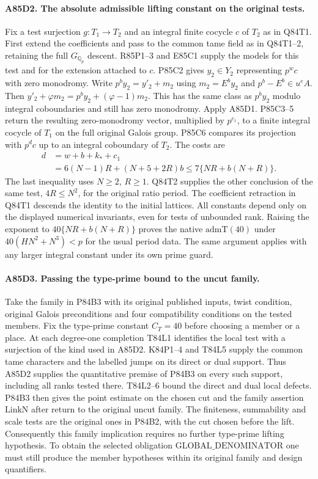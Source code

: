 \paragraph{A85D2. The absolute admissible lifting constant on the original tests.}
Fix a test surjection $g:T_1\to T_2$ and an integral finite
cocycle $c$ of $T_2$ as in Q84T1. First extend the coefficients
and pass to the common tame field as in Q84T1--2, retaining the
full $G_{\mathbb Q_p}$ descent. R85P1--3 and E85C1 supply the
models for this test and for the extension attached to $c$.
P85C2 gives $y_2\in Y_2$ representing $p^w c$ with zero
monodromy. Write $p^b y_2=y'_2+m_2$ using
$m_2=E^b y_2$ and $p^b-E^b\in u^e A$. Then
$y'_2+\varphi m_2=p^b y_2+(\varphi-1)m_2$. This has the
same class as $p^b y_2$ modulo integral coboundaries and still
has zero monodromy. Apply A85D1. P85C3--5 return the resulting
zero-monodromy vector, multiplied by $p^{c_1}$, to a finite
integral cocycle of $T_1$ on the full original Galois group.
P85C6 compares its projection with $p^{d}c$ up to an integral
coboundary of $T_2$. The costs are
\[
 \begin{aligned}
 d&=w+b+k_*+c_1\\
  &=6(N-1)R+(N+5+2R)b\le 7\{NR+b(N+R)\}.
 \end{aligned}
\]
The last inequality uses $N\ge2$, $R\ge1$. Q84T2 supplies the
other conclusion of the same test, $4R\le N^2$, for the original
ratio period. The coefficient
retraction in Q84T1 descends the identity to the initial lattices.
All constants depend only on the displayed numerical invariants,
even for tests of unbounded rank. Raising the exponent to
$40\{NR+b(N+R)\}$ proves the native $\mathrm{admT}(40)$
under $40(HN^2+N^3)<p$ for the usual period data. The same
argument applies with any larger integral constant under its own
prime guard.

\paragraph{A85D3. Passing the type-prime bound to the uncut family.}
Take the family in P84B3 with its original published inputs, twist
condition, original Galois preconditions and four compatibility
conditions on the tested members. Fix the type-prime constant
$C_T=40$ before choosing a member or a place. At each degree-one
completion T84L1 identifies the local test with a surjection of the
kind used in A85D2. K84P1--4 and T84L5 supply the common tame
characters and the labelled jumps on its direct or dual support.
Thus A85D2 supplies the quantitative premise of P84B3 on every
such support, including all ranks tested there. T84L2--6 bound
the direct and dual local defects. P84B3 then gives the point
estimate on the chosen cut and the family assertion
$\mathrm{LinkN}$ after return to the original uncut family.
The finiteness, summability and scale tests are the original
ones in P84B2, with the cut chosen before the lift. Consequently
this family implication requires no further type-prime lifting
hypothesis. To obtain the selected obligation
$\mathrm{GLOBAL\_DENOMINATOR}$ one must still produce the
member hypotheses within its original family and design quantifiers.
